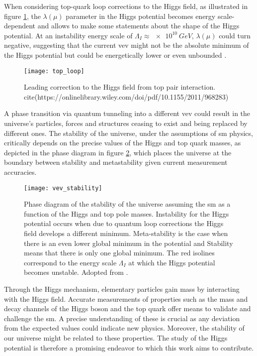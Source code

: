 When considering top-quark loop corrections to the Higgs field, as illustrated in figure \ref{fig:top_loop}, the $\lambda(\mu)$ parameter in the Higgs potential becomes energy scale-dependent and allows to make some statements about the shape of the Higgs potential. At an instability energy scale of $\Lambda_I\approx \qty[]{e10}{GeV}$, $\lambda(\mu)$ could turn negative, suggesting that the current \ac{vev} might not be the absolute minimum of the Higgs potential but could be energetically lower or even unbounded \citep{devoto2022false}.


\begin{figure}
    \centering
    \texttt{[image: top\_loop]}
    \caption[]{Leading correction to the Higgs field from top pair interaction. cite(https://onlinelibrary.wiley.com/doi/pdf/10.1155/2011/968283)}
    \label{fig:top_loop}
\end{figure}


A phase transition via quantum tunneling into a different \ac{vev} could result in the universe's particles, forces and structures ceasing to exist and being replaced by different ones. The stability of the universe, under the assumptions of \ac{sm} physics, critically depends on the precise values of the Higgs and top quark masses, as depicted in the phase diagram in figure \ref{fig:vev_stability}, which places the universe at the boundary between stability and metastability given current measurement accuracies.


\begin{figure}
    \centering
    \texttt{[image: vev\_stability]}
    \caption[]{Phase diagram of the stability of the universe assuming the \ac{sm} as a function of the Higgs and top pole masses. Instability for the Higgs potential occurs when due to quantum loop corrections the Higgs field develops a different minimum. Meta-stability is the case when there is an even lower global minimum in the potential and Stability means that there is only one global minimum. The red isolines correspond to the energy scale $\Lambda_I$ at which the Higgs potential becomes unstable. Adopted from \citep{Buttazzo:2013uya}.}
    \label{fig:vev_stability}
\end{figure}





Through the Higgs mechanism, elementary particles gain mass by interacting with the Higgs field. Accurate measurements of properties such as the mass and decay channels of the Higgs boson and the top quark offer means to validate and challenge the \ac{sm}. A precise understanding of these is crucial as any deviation from the expected values could indicate new physics. Moreover, the stability of our universe might be related to these properties. The study of the Higgs potential is therefore a promising endeavor to which this work aims to contribute.

